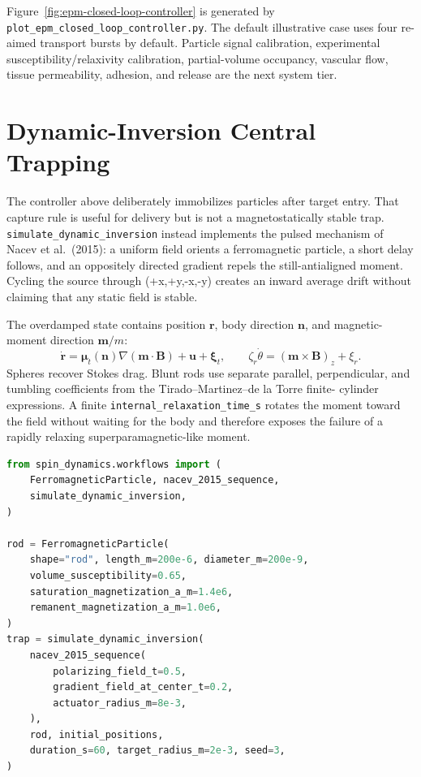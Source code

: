 \documentclass[11pt,oneside]{report}
\newcommand{\code}[1]{\texttt{#1}}
\begin{document}
Figure~\ref{fig:epm-closed-loop-controller} is generated by
\code{plot\_epm\_closed\_loop\_controller.py}. The default illustrative case
uses four re-aimed transport bursts by default. Particle signal calibration,
experimental susceptibility/relaxivity calibration, partial-volume occupancy, vascular flow,
tissue permeability, adhesion, and release are the next system tier.

\section{Dynamic-Inversion Central Trapping}

The controller above deliberately immobilizes particles after target entry.
That capture rule is useful for delivery but is not a magnetostatically stable
trap. \code{simulate\_dynamic\_inversion} instead implements the pulsed
mechanism of Nacev et al.\ (2015): a uniform field orients a ferromagnetic
particle, a short delay follows, and an oppositely directed gradient repels the
still-antialigned moment. Cycling the source through (+x,+y,-x,-y) creates an
inward average drift without claiming that any static field is stable.

The overdamped state contains position \(\mathbf r\), body direction
\(\mathbf n\), and magnetic-moment direction \(\mathbf m/m\):
\[
 \dot{\mathbf r}=\boldsymbol{\mu}_t(\mathbf n)
   \nabla(\mathbf m\!\cdot\!\mathbf B)+\mathbf u+\boldsymbol{\xi}_t,
 \qquad
 \zeta_r\dot{\theta}=(\mathbf m\times\mathbf B)_z+\xi_r.
\]
Spheres recover Stokes drag. Blunt rods use separate parallel, perpendicular,
and tumbling coefficients from the Tirado--Martinez--de la Torre finite-
cylinder expressions. A finite \code{internal\_relaxation\_time\_s} rotates the
moment toward the field without waiting for the body and therefore exposes the
failure of a rapidly relaxing superparamagnetic-like moment.

\begin{lstlisting}[language=Python]
from spin_dynamics.workflows import (
    FerromagneticParticle, nacev_2015_sequence,
    simulate_dynamic_inversion,
)

rod = FerromagneticParticle(
    shape="rod", length_m=200e-6, diameter_m=200e-9,
    volume_susceptibility=0.65,
    saturation_magnetization_a_m=1.4e6,
    remanent_magnetization_a_m=1.0e6,
)
trap = simulate_dynamic_inversion(
    nacev_2015_sequence(
        polarizing_field_t=0.5,
        gradient_field_at_center_t=0.2,
        actuator_radius_m=8e-3,
    ),
    rod, initial_positions,
    duration_s=60, target_radius_m=2e-3, seed=3,
)
\end{lstlisting}
\end{document}
